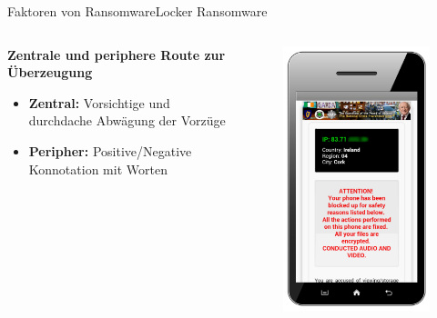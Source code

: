 \documentclass[10pt]{beamer}
\begin{document}
\begin{frame}{Faktoren von Ransomware}{Locker Ransomware}
\begin{columns}
\begin{column}{6cm}
\textbf{Zentrale und periphere Route zur Überzeugung}
\begin{itemize}
\item \textbf{Zentral:} Vorsichtige und durchdache Abwägung der Vorzüge
\item \textbf{Peripher:} Positive/Negative Konnotation mit Worten
\end{itemize}
\end{column}
\begin{column}{5cm}
\begin{figure}[p]
		\centering
		\includegraphics[scale=0.3]{Lockdroid.png}

	\end{figure}
\end{column}
\end{columns}


\end{frame}
\end{document}
